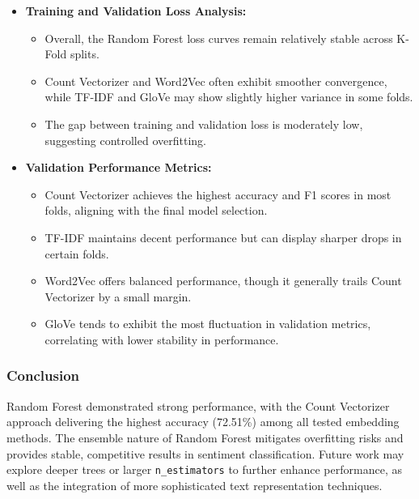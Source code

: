 \begin{itemize}
    \item \textbf{Training and Validation Loss Analysis:}
    \begin{itemize}
        \item Overall, the Random Forest loss curves remain relatively stable across K-Fold splits.
        \item Count Vectorizer and Word2Vec often exhibit smoother convergence, while TF-IDF and GloVe may show slightly higher variance in some folds.
        \item The gap between training and validation loss is moderately low, suggesting controlled overfitting.
    \end{itemize}
    
    \item \textbf{Validation Performance Metrics:}
    \begin{itemize}
        \item Count Vectorizer achieves the highest accuracy and F1 scores in most folds, aligning with the final model selection.
        \item TF-IDF maintains decent performance but can display sharper drops in certain folds.
        \item Word2Vec offers balanced performance, though it generally trails Count Vectorizer by a small margin.
        \item GloVe tends to exhibit the most fluctuation in validation metrics, correlating with lower stability in performance.
    \end{itemize}
\end{itemize}

\subsubsection{Conclusion}

Random Forest demonstrated strong performance, with the Count Vectorizer approach delivering the highest accuracy (72.51\%) among all tested embedding methods. The ensemble nature of Random Forest mitigates overfitting risks and provides stable, competitive results in sentiment classification. Future work may explore deeper trees or larger \texttt{n\_estimators} to further enhance performance, as well as the integration of more sophisticated text representation techniques.

